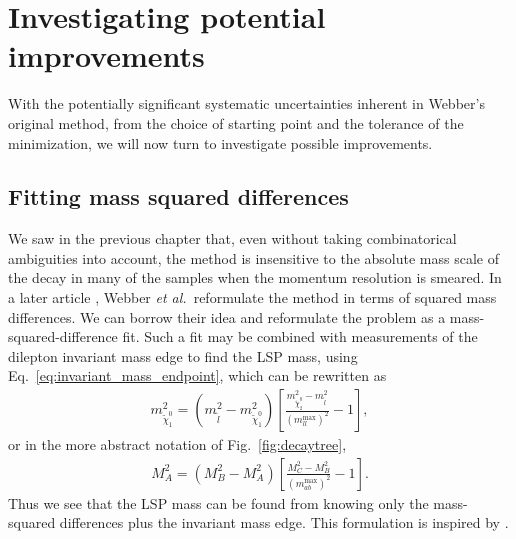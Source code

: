 \documentclass[twoside,english]{uiofysmaster}
\begin{document}




























\chapter{Investigating potential improvements}%
\label{ch:investigating_improvements}
With the potentially significant systematic uncertainties inherent in Webber's original method, from the choice of starting point and the tolerance of the minimization, we will now turn to investigate possible improvements.


\section{Fitting mass squared differences}
We saw in the previous chapter that, even without taking combinatorical ambiguities into account, the method is insensitive to the absolute mass scale of the decay in many of the samples when the momentum resolution is smeared. In a later article \cite{Nojiri:2010dk}, Webber {\it et al.}\ reformulate the method in terms of squared mass differences. We can borrow their idea and reformulate the problem as a mass-squared-difference fit. Such a fit may be combined with measurements of the dilepton invariant mass edge to find the LSP mass, using Eq.\ \eqref{eq:invariant_mass_endpoint}, which can be rewritten as
\begin{align}
	m^2_{\tilde\chi_1^0} = (m^2_{\tilde l} - m^2_{\tilde \chi_1^0})\left[\frac{m^2_{\tilde\chi_2^0} - m^2_{\tilde l}}{(m_{ll}^\mathrm{max})^2} - 1\right],
\end{align}
or in the more abstract notation of Fig.\ \ref{fig:decaytree},
\begin{align}
	M^2_A = (M^2_B - M^2_A)\left[\frac{M^2_C - M^2_B}{(m_{ab}^\mathrm{max})^2} - 1\right].\label{eq:MLSP_dilepton_edge}
\end{align}
Thus we see that the LSP mass can be found from knowing only the mass-squared differences plus the invariant mass edge. This formulation is inspired by \cite{Cheng:2009fw}.
\end{document}
